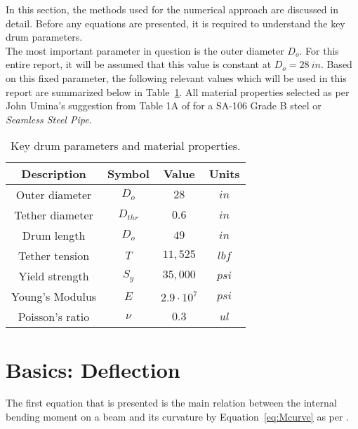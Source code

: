 \label{chapt:prelim}

In this section, the methods used for the numerical approach are discussed in detail. Before any equations are presented, it is required to understand the key drum parameters.\\

The most important parameter in question is the outer diameter $D_o$. For this entire report, it will be assumed that this value is constant at $D_o = 28\ in$. Based on this fixed parameter, the following relevant values which will be used in this report are summarized below in Table~\ref{table:prelim_params}. All material properties selected as per John Umina's  suggestion from Table 1A of \citep{ASMEbvpcIID} for a SA-106 Grade B steel or \emph{Seamless Steel Pipe}.\\

\begin{table}[ht]
	\caption{Key drum parameters and material properties.}
	\centering
	\begin{tabular}{c c c c}
		\hline \textbf{Description} & \textbf{Symbol} & \textbf{Value} & \textbf{Units}\\[1 ex]
		\hline
		Outer diameter		&$D_o$			& $28$		& $in$ 	\\
		Tether diameter		&$D_{thr}$		& $0.6$		& $in$ 	\\
		Drum length			&$D_o$			& $49$		& $in$ 	\\
		Tether tension		&$T$			& $11,525$	& $lbf$	\\	
		Yield strength		&$S_y$			& $35,000$	& $psi$	\\	
		Young's Modulus		&$E$			& $2.9\cdot 10^7$ &$psi$\\
		Poisson's ratio		&$\nu$			& $0.3$		& $ul$	\\	
		\hline
	\end{tabular}
	\label{table:prelim_params}
\end{table}

\section{Basics: Deflection}

The first equation that is presented is the main relation between the internal bending moment on a beam and its curvature by Equation~\ref{eq:Mcurve} as per \citep{nisbett2014shigley}. 

